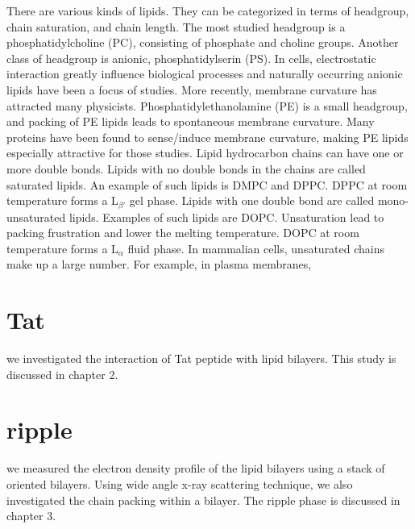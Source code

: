 There are various kinds of lipids. They can be 
categorized in terms of headgroup, chain saturation, and chain length.
The most studied headgroup is a phosphatidylcholine (PC),
consisting of phosphate and choline groups. Another class of headgroup is
anionic, phosphatidylserin (PS). In cells, electrostatic interaction 
greatly influence biological processes and naturally occurring anionic
lipids have been a focus of studies. More recently, membrane curvature
has attracted many physicists. Phosphatidylethanolamine (PE) is a small 
headgroup, and packing of PE lipids leads to spontaneous membrane curvature.
Many proteins have been found to sense/induce membrane curvature, 
making PE lipids especially attractive for those studies.
Lipid hydrocarbon chains can have one or more double bonds. Lipids
with no double bonds in the chains are called saturated lipids.
An example of such lipids is DMPC and DPPC. DPPC at room temperature
forms a L$_{\beta'}$ gel phase.
Lipids with one double bond
are called mono-unsaturated lipids. Examples of such lipids are DOPC.
Unsaturation lead to packing frustration and lower the melting 
temperature. DOPC at room temperature forms a L$_{\alpha}$ fluid phase.
In mammalian cells, unsaturated chains make up a large number.
For example, in plasma membranes,

\section{Tat}
we investigated the interaction of Tat peptide with lipid bilayers. 
This study is discussed in chapter 2.

\section{ripple}
we measured the electron density profile of the lipid
bilayers using a stack of oriented bilayers. Using wide angle x-ray scattering
technique, we also investigated the chain packing within a bilayer. 
The ripple phase is discussed in chapter 3. 